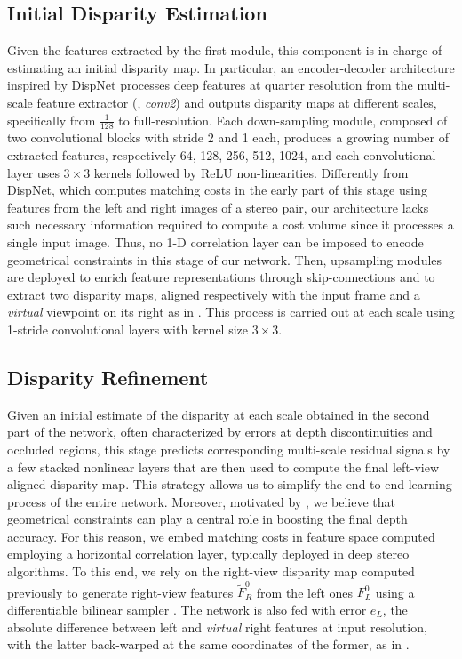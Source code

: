 \documentclass[10pt,twocolumn,letterpaper]{article}
\begin{document}
\subsection{Initial Disparity Estimation}

Given the features extracted by the first module, this component is in charge of estimating an initial disparity map. In particular, an encoder-decoder architecture inspired by DispNet processes deep features at quarter resolution from the multi-scale feature extractor (\ie, \textit{conv2}) and outputs disparity maps at different scales, specifically from $\frac{1}{128}$ to full-resolution. Each down-sampling module, composed of two convolutional blocks with stride 2 and 1 each, produces a growing number of extracted features, respectively 64, 128, 256, 512, 1024, and each convolutional layer uses $3\times3$ kernels followed by ReLU non-linearities. Differently from DispNet, which computes matching costs in the early part of this stage using features from the left and right images of a stereo pair, our architecture lacks such necessary information required to compute a cost volume since it processes a single input image.  Thus, no 1-D correlation layer can be imposed to encode geometrical constraints in this stage of our network. Then, upsampling modules are deployed to enrich feature representations through skip-connections and to extract two disparity maps, aligned respectively with the input frame and a \emph{virtual} viewpoint on its right as in \cite{monodepth17}. This process is carried out at each scale using 1-stride convolutional layers with kernel size $3\times3$.    



\subsection{Disparity Refinement}
\label{sec:refinement}

Given an initial estimate of the disparity at each scale obtained in the second part of the network, often characterized by errors at depth discontinuities and occluded regions, this stage predicts corresponding multi-scale residual signals \cite{he2016deep} by a few stacked nonlinear layers that are then used to compute the final left-view aligned disparity map. This strategy allows us to simplify the end-to-end learning process of the entire network. Moreover, motivated by \cite{luo2018single}, we believe that geometrical constraints can play a central role in boosting the final depth accuracy. For this reason, we embed matching costs in feature space computed employing a horizontal correlation layer, typically deployed in deep stereo algorithms. To this end, we rely on the right-view disparity map computed previously to generate right-view features $\tilde{F}_R^0$ from the left ones $F_L^0$ using a differentiable bilinear sampler \cite{jaderberg2015spatial}. 
The network is also fed with error $e_L$, \ie the absolute difference between left and \textit{virtual} right features at input resolution, with the latter back-warped at the same coordinates of the former, as in \cite{liang2018learning}.
\end{document}
